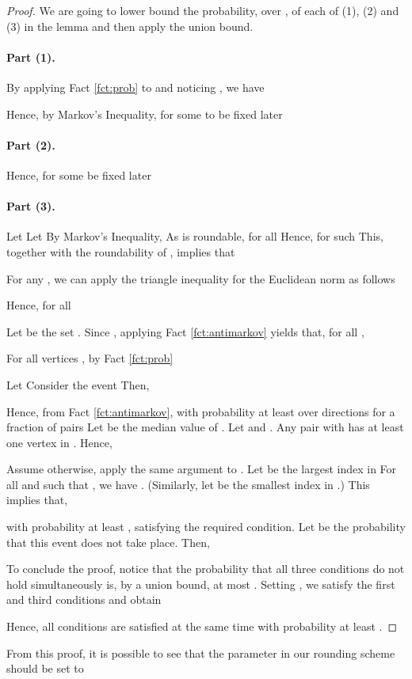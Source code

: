 \documentclass[twoside,leqno,twocolumn]{article}
\numberwithin{equation}{section}
\begin{document}
\begin{proof}
We are going to lower bound the probability, over ,  of each of (1), (2) and (3) in the lemma and then apply the union bound. 

\paragraph{Part (1).} 
By applying Fact \ref{fct:prob} to  and noticing  , we have

Hence, by Markov's Inequality, for some  to be fixed later


\paragraph{Part (2).}
 Hence, for some  be fixed later 

 
\paragraph{Part (3).}
Let  
Let 
By Markov's Inequality, 
As  is roundable, for all   Hence,    for such  
This, together with the roundability of , implies that

For any , we can apply the triangle inequality for the Euclidean norm as follows

Hence, for all 

Let  be the set . 
Since , applying Fact \ref{fct:antimarkov} yields that, for all , 

For all vertices , by Fact \ref{fct:prob}

Let  Consider the event 
Then,


Hence, from Fact \ref{fct:antimarkov}, with probability at least  over directions  for a fraction  of pairs    
Let  be the median value of .
Let  and . Any pair  with  has at least one vertex in . 
Hence,

Assume  otherwise, apply the same argument to .
Let  be the largest index in  
For all  and  such that , we have . (Similarly, let  be the smallest index in .)
This implies that, 

with probability at least , satisfying the required condition.
Let  be the probability that this event does not take place. Then,


\noindent
To conclude the proof, notice that the probability that all three conditions do not hold simultaneously is, by a union bound, at most . Setting , we satisfy the first and third conditions and obtain

Hence, all conditions are satisfied at the same time with probability at least .
\end{proof}
\noindent
From this proof, it is possible to see that the parameter  in our rounding scheme should be set to 
\end{document}

